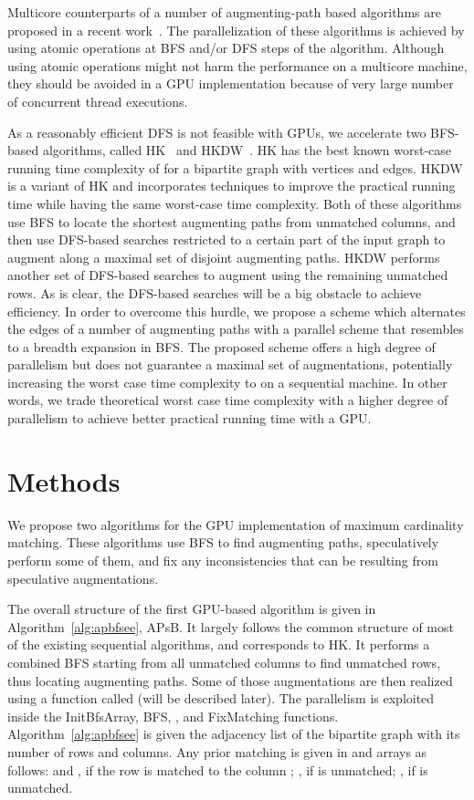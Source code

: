 \documentclass[11pt,a4paper]{article}
\newcommand{\APSBFS}{APsB\xspace}
\newcommand{\fixinconsistent}{{\sc FixMatching}\xspace}
\newcommand{\altswap}{{\sc{Alternate}}\xspace}
\begin{document}
Multicore 
counterparts of a number of augmenting-path based algorithms are proposed in a recent work~\cite{ahrbka:12}. The parallelization 
of these algorithms is achieved by using atomic operations at BFS and/or DFS steps 
of the algorithm. Although using atomic operations might not harm the performance 
on a multicore machine, they should be avoided in a GPU 
implementation because of very large number of concurrent thread executions. 

As a reasonably efficient DFS is not feasible with GPUs, we accelerate two BFS-based algorithms, called HK~\cite{hopcroft1973n} and HKDW~\cite{duwi:88}.
HK has the best known worst-case running time complexity of  for a bipartite graph with  vertices and  edges.
HKDW is a variant of HK and incorporates techniques to improve the practical running time while having the same worst-case time complexity.
Both of these algorithms use BFS to locate the shortest augmenting paths from unmatched columns, 
and then use DFS-based searches restricted to a certain part of the input graph to augment along a maximal set of disjoint augmenting paths.
HKDW performs another set of DFS-based searches to augment using the remaining unmatched rows. 
As is clear, the DFS-based searches will be a big obstacle to achieve efficiency. 
In order to overcome this hurdle, we propose a scheme which alternates the edges of a number of 
augmenting paths with a parallel scheme that resembles to a breadth expansion in BFS. 
The proposed scheme offers a high degree of parallelism but does not guarantee a maximal set of augmentations, potentially increasing the worst case time complexity to   on a sequential machine. 
In other words, we trade theoretical worst case time complexity with a higher degree of parallelism to achieve better practical running time with a GPU. 

\section{Methods}\label{sec:met}
We propose two algorithms for the GPU implementation of maximum cardinality 
matching. 
These algorithms use BFS to find augmenting paths, speculatively perform some of them, and
fix any inconsistencies that can be resulting from speculative augmentations. 

The overall structure of the first GPU-based algorithm is given in Algorithm~\ref{alg:apbfsee},  \APSBFS.
It largely follows the common structure of most of the existing sequential algorithms, and corresponds to HK. 
It performs a combined BFS starting from all unmatched columns to find unmatched rows, thus locating augmenting paths.
Some of those augmentations are then realized using a function called \altswap (will be described later).
The parallelism is exploited inside the {\sc InitBfsArray}, {\sc BFS}, \altswap, and \fixinconsistent functions. 
Algorithm~\ref{alg:apbfsee} is given the adjacency list 
of the bipartite graph with its number of rows and columns. 
Any prior matching 
is given in  and  arrays as follows:  and
, if the row  is matched to the column ;  
, if  is unmatched; , if  is unmatched.
\end{document}
